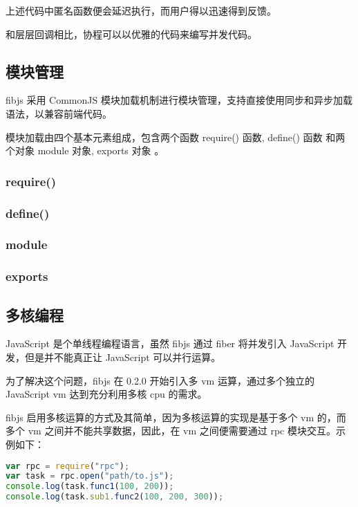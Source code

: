 上述代码中匿名函数便会延迟执行，而用户得以迅速得到反馈。

和层层回调相比，协程可以以优雅的代码来编写并发代码。


\subsection{模块管理}


fibjs 采用 CommonJS 模块加载机制进行模块管理，支持直接使用同步和异步加载语法，以兼容前端代码。

模块加载由四个基本元素组成，包含两个函数 require() 函数, define() 函数 和两个对象 module 对象, exports 对象 。 


\subsubsection{require()}



\subsubsection{define()}


\subsubsection{module}



\subsubsection{exports}



\subsection{多核编程}


JavaScript 是个单线程编程语言，虽然 fibjs 通过 fiber 将并发引入 JavaScript 开发，但是并不能真正让 JavaScript 可以并行运算。

为了解决这个问题，fibjs 在 0.2.0 开始引入多 vm 运算，通过多个独立的 JavaScript vm 达到充分利用多核 cpu 的需求。




fibjs 启用多核运算的方式及其简单，因为多核运算的实现是基于多个 vm 的，而多个 vm 之间并不能共享数据，因此，在 vm 之间便需要通过 rpc 模块交互。示例如下：



\begin{lstlisting}[language=JavaScript]
var rpc = require("rpc");
var task = rpc.open("path/to.js");
console.log(task.func1(100, 200));
console.log(task.sub1.func2(100, 200, 300));
\end{lstlisting}

